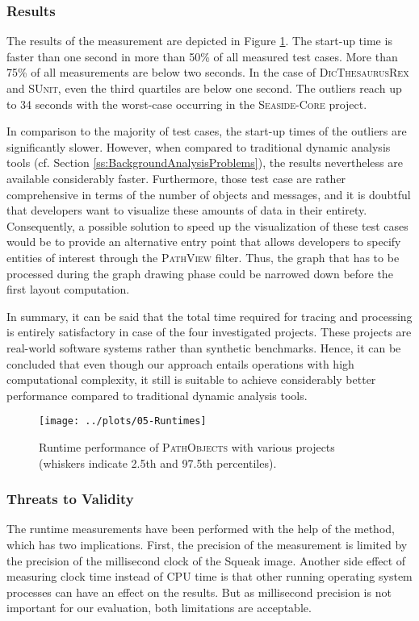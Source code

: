 \subsubsection{Results}
The results of the measurement are depicted in Figure \ref{f:DiscussionRuntime}.
The start-up time is faster than one second in more than 50\% of all measured test cases.
More than 75\% of all measurements are below two seconds.
In the case of \textsc{DicThesaurusRex} and \textsc{SUnit}, even the third quartiles are below one second.
The outliers reach up to 34 seconds with the worst-case occurring in the \textsc{Seaside-Core} project.

In comparison to the majority of test cases, the start-up times of the outliers are significantly slower.
However, when compared to traditional dynamic analysis tools (cf. Section \ref{ss:BackgroundAnalysisProblems}), the results nevertheless are available considerably faster.
Furthermore, those test case are rather comprehensive in terms of the number of objects and messages, and it is doubtful that developers want to visualize these amounts of data in their entirety.
Consequently, a possible solution to speed up the visualization of these test cases would be to provide an alternative entry point that allows developers to specify entities of interest through the \textsc{PathView} filter.
Thus, the graph that has to be processed during the graph drawing phase could be narrowed down before the first layout computation.

In summary, it can be said that the total time required for tracing and processing is entirely satisfactory in case of the four investigated projects.
These projects are real-world software systems rather than synthetic benchmarks.
Hence, it can be concluded that even though our approach entails operations with high computational complexity, it still is suitable to achieve considerably better performance compared to traditional dynamic analysis tools.

\begin{figure}[b!]
	\centering
	\texttt{[image: ../plots/05-Runtimes]}
	\caption[Runtime Performance of \textsc{PathObjects}]{Runtime performance of \textsc{PathObjects} with various projects (whiskers indicate 2.5th and 97.5th percentiles).}
	\label{f:DiscussionRuntime}
\end{figure}

\subsubsection{Threats to Validity}
The runtime measurements have been performed with the help of the  method, which has two implications.
First, the precision of the measurement is limited by the precision of the millisecond clock of the Squeak image.
Another side effect of measuring clock time instead of CPU time is that other running operating system processes can have an effect on the results.
But as millisecond precision is not important for our evaluation, both limitations are acceptable.

